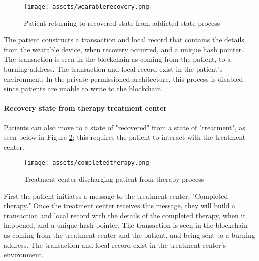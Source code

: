 \documentclass[12pt]{report}
\begin{document}
\begin{figure}[!h]
\begin{center}
\texttt{[image: assets/wearablerecovery.png]}
\end{center}
\caption{Patient returning to recovered state from addicted state process}
\label{fig:wearablerecovery}
\end{figure}

The patient constructs a transaction and local record that contains the details from the wearable device, when recovery occurred, and a unique hash pointer.  The transaction is seen in the blockchain as coming from the patient, to a burning address. The transaction and local record exist in the patient's environment. In the private permissioned architecture, this process is disabled since patients are unable to write to the blockchain.

\paragraph{Recovery state from therapy treatment center}
Patients can also move to a state of "recovered" from a state of "treatment", as seen below in Figure \ref{fig:completedtherapy}; this requires the patient to interact with the treatment center.

\begin{figure}[!h]
\texttt{[image: assets/completedtherapy.png]}
\caption{Treatment center discharging patient from therapy process}
\label{fig:completedtherapy}
\end{figure}

First the patient initiates a message to the treatment center, "Completed therapy." Once the treatment center receives this message, they will build a transaction and local record with the details of the completed therapy, when it happened, and a unique hash pointer. The transaction is seen in the blockchain as coming from the treatment center and the patient, and being sent to a burning address. The transaction and local record exist in the treatment center's environment.
\end{document}
